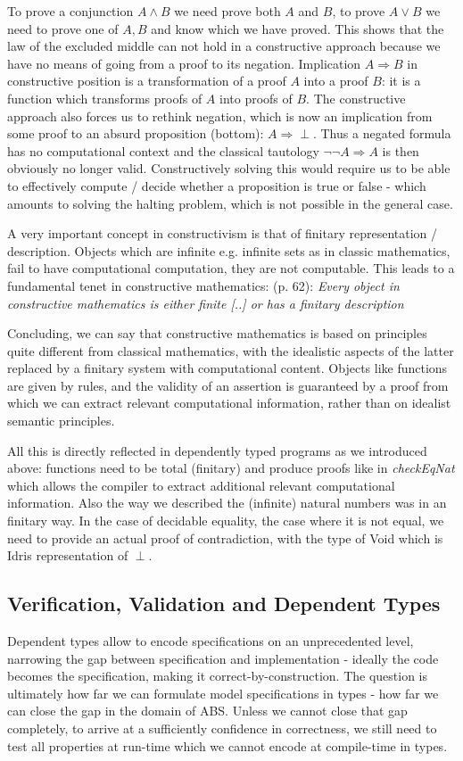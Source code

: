 To prove a conjunction $A \land B$ we need prove both $A$ and $B$, to prove $A \lor B$ we need to prove one of $A, B$ and know which we have proved. This shows that the law of the excluded middle can not hold in a constructive approach because we have no means of going from a proof to its negation. Implication $A \Rightarrow B$ in constructive position is a transformation of a proof $A$ into a proof $B$: it is a function which transforms proofs of $A$ into proofs of $B$. The constructive approach also forces us to rethink negation, which is now an implication from some proof to an absurd proposition (bottom): $A \Rightarrow \perp$. Thus a negated formula has no computational context and the classical tautology $\neg \neg A \Rightarrow A$ is then obviously no longer valid.  Constructively solving this would require us to be able to effectively compute / decide whether a proposition is true or false - which amounts to solving the halting problem, which is not possible in the general case.

A very important concept in constructivism is that of finitary representation / description. Objects which are infinite e.g. infinite sets as in classic mathematics, fail to have computational computation, they are not computable. This leads to a fundamental tenet in constructive mathematics: \cite{thompson_type_1991} (p. 62): \textit{Every object in constructive mathematics is either finite [..] or has a finitary description}

Concluding, we can say that constructive mathematics is based on principles quite different from classical mathematics, with the idealistic aspects of the latter replaced by a finitary system with computational content. Objects like functions are given by rules, and the validity of an assertion is guaranteed by a proof from which we can extract relevant computational information, rather than on idealist semantic principles. 

All this is directly reflected in dependently typed programs as we introduced above: functions need to be total (finitary) and produce proofs like in \textit{checkEqNat} which allows the compiler to extract additional relevant computational information. Also the way we described the (infinite) natural numbers was in an finitary way. In the case of decidable equality, the case where it is not equal, we need to provide an actual proof of contradiction, with the type of Void which is Idris representation of $\perp$. 

\subsection{Verification, Validation and Dependent Types}
\label{sec:dep_vav_deptypes}
Dependent types allow to encode specifications on an unprecedented level, narrowing the gap between specification and implementation - ideally the code becomes the specification, making it correct-by-construction. The question is ultimately how far we can formulate model specifications in types - how far we can close the gap in the domain of ABS. Unless we cannot close that gap completely, to arrive at a sufficiently confidence in correctness, we still need to test all properties at run-time which we cannot encode at compile-time in types.

